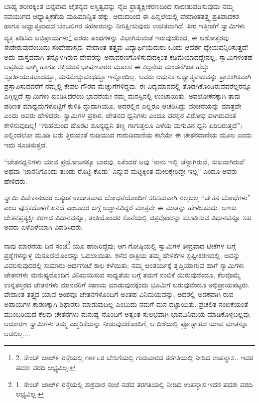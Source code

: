 ಬಾಹ್ಯ ಶರೀರಕ್ಕಿಂತ ಭಿನ್ನವಾದ ಚೈತನ್ಯದ ಅಸ್ತಿತ್ವವನ್ನು ನೈಜ ಪ್ರಾತ್ಯಕ್ಷೀಕರಣದಿಂದ ಸಾಬೀತುಪಡಿಸುವುದು ನಮ್ಮ ನವಯುಗದ ಆಧ್ಯಾತ್ಮಿಕತೆಯ ಮಹಿಮಾನ್ವಿತ ಹಕ್ಕು. ಆದುದರಿಂದ ಈ ಹಿನ್ನಲೆಯಲ್ಲಿ ವೇದಾಂತತತ್ತ್ವ ಪ್ರತಿಪಾದಕರ ಹಾಗೂ ಆಧ್ಯಾತ್ಮವಾದದ ಬೆಂಬಲಿಗರ ಸಹಕಾರವನ್ನು ನೀರಿಕ್ಷೀಸುವುದು ಉಚಿತವಾಗಿದೆ. ತೀರ ಇತ್ತೀಚೆಗೆ ಸ್ವಾಮಿಗಳು ವ್ಯಕ್ತ ಪಡಿಸಿದ ಅಭಿಪ್ರಾಯಗಳು\footnote{2. ಸೇಂಟ್ ಜಾರ್ಜ್ ರಸ್ತೆಯಲ್ಲಿ ೧೮೯೬ರ ಬೇಸಿಗೆಯಲ್ಲಿ ಗುರುವಾರದ ತರಗತಿಯಲ್ಲಿ ನೀಡಿದ ಉಪನ್ಯಾಸ.. ಇದರ ಪದಶಃ ವರದಿ ಲಭ್ಯವಿಲ್ಲ.} ಎರಡು ಪಂಥಗಳನ್ನು ವಿಭಾಗಿಸುವಂತೆ ಇರುವುದರಿಂದ, ಈ ಆಶೋತ್ತರವು ಈಡೇರುವುದೆಂಬುದು ಸಂದೇಹಾಸ್ಪದ. ವೇದಾಂತ ತತ್ತ್ವವು ವಿದ್ಯಾರ್ಥಿಯೆದುರು ಒಂದು ಆದರ್ಶ ಧ್ಯೇಯವನ್ನಿರಿಸುತ್ತದೆ! ಅದು ವಾಸ್ತವವಾಗಿ ತನ್ನೊಳಗಿರುವ ದೇವರನ್ನು ಅನಾವರಣಗೊಳಿಸುವುದಕ್ಕಿಂತ ಕಡಿಮೆಯಾದದ್ದೇನಲ್ಲ; ಸ್ವಾಮಿಗಳಂತಹ ಅಪ್ರತಿಮ ವಾಗ್ಮಿ ಹಾಗೂ ಶಕ್ತಿಯುತ ಭಾಷಣಕಾರರ ಮೂಲಕ ಈ ಕಲ್ಪನೆಯ ಮಂಡನೆಗಿಂತ ಹೆಚ್ಚು ಸ್ಫೂರ್ತಿಯುತವಾದದ್ದೂ, ಮನಮೆಚ್ಚುವಂಥದ್ದೂ ಇನ್ನೊಂದಿಲ್ಲ. ಅವರು ಆಧುನಿಕ ಅಧ್ಯಾತ್ಮವಾದವನ್ನು ಪ್ರಾಸಂಗಿಕವಾಗಿ ಪ್ರಸ್ತಾಪಿಸುವವರೆಗೆ ನಮ್ಮಲ್ಲಿ ಕೇವಲ ಗೌರವ ಮೆಚ್ಚುಗೆಗಳಿದ್ದವು. ಈ ವಿದ್ಯಮಾನದಲ್ಲಿ ತೊಡಗಿಕೊಂಡಿರುವವರೆಲ್ಲರನ್ನೂ ಎಗ್ಗಿಲ್ಲದೆ ಸ್ವಾಮಿಗಳು ಖಂಡಿಸಿದರೆಂಬ ಭಾವನೆಯೇ ನಮ್ಮ ಮನಸ್ಸಿನಲ್ಲಿ ಉಂಟಾಯಿತು. ಅವಲೋಕನಕ್ಕಾಗಿ ತಾವು ಪರಿಣತ ಮಾಧ್ಯಮಗಳೊಟ್ಟಿಗೆ ಕುಳಿತಿ ದ್ದುದಾಗಿಯೂ, ಅದರಲ್ಲಿನ ಎಲ್ಲರೂ ಆಚರಿಸಿದ್ದು ವಂಚನೆಯನ್ನು ಮಾತ್ರವೇ ಎಂದು ಅವರು ಹೇಳಿದರು. ಸ್ವಾಮಿಗಳ ಪ್ರಕಾರ, ಚೇತನದ ಧ್ವನಿಗಳು ಎಂದೂ ಪರಸ್ಪರ ವಿರೋಧ ವಾಗಿರುವಂತೆ ಕೇಳಿಸುವುದಿಲ್ಲ! “ಗುಹೆಯಿಂದ ಹೊರಟ ಶೂನ್ಯಧ್ವನಿ ತಣ್ಣ ಗಾಗುತ್ತಲೂ ಎಳೆಯ ಮಗುವಿನ ಧ್ವನಿ ಏರಿಬರುತ್ತದೆ”; ಎಲ್ಲಿಂದಲೋ ಮೂಡಿ ಬರು ತ್ತಿರುವಂತೆ ನುಡಿಯುವ ಗಾರುಡಿವಾಣಿಯ ಕಲೆಯೇ ಈ ಚೇತನವಾಣಿಯ ಮೂಲ ಎಂದು ಇದು ಸೂಚಿಸುತ್ತದೆ.

“ಚೇತನಧ್ವನಿಗಳು ಯಾವ ಪ್ರಯೋಜನಕ್ಕೂ ಬಾರವು, ಏಕೆಂದರೆ ಅವು ‘ನಾನು ಇಲ್ಲಿ ಚೆನ್ನಾಗಿರುವೆ, ಸುಖವಾಗಿರುವೆ’ ಅಥವಾ ‘ಜಾನನಿಗೊಂದು ತುಂಡು ರೊಟ್ಟಿ ಕೊಡು’ ಎನ್ನುವ ಮಟ್ಟಕ್ಕಿಂತ ಮೇಲಕ್ಕೇರಿದ್ದೇ ಇಲ್ಲ” ಎಂದೂ ಅವರು ಹೇಳಿದರು.

ಸ್ವಾಮಿ ವಿವೇಕಾನಂದರ ಅತ್ಯಂತ ಉದಾತ್ತವಾದ ಬೋಧನೆಯೊಂದಿಗೆ ಸರಿಸಮವಾಗಿ ನಿಲ್ಲಬಲ್ಲ “ಚೇತನ ಬೋಧೆಗಳು” ಎಂಬ ಪುಸ್ತಕದೊಳಗೆ ಏನಿದೆ ಎಂಬುದರ ಬಗ್ಗೆ ಅಜ್ಞಾನವಿದ್ದರೆ ಮಾತ್ರವೇ ಈ ಮಾತನ್ನು ಹೇಳಬಹುದು. ಅಣಕು ಚೇತನಪ್ರತ್ಯಕ್ಷೀ ಕರಣದ ವಿಧಾನವನ್ನೂ, ತಂತಿಯೊಂದರ ಕೊನೆಯಲ್ಲಿ ಚಿತ್ರವೊಂದನ್ನು ಮೂಡಿಸುವ ವಿಧಾನವನ್ನೂ ಸಹ ಅವರು ಎಳೆಎಳೆಯಾಗಿ ವಿವರಿಸಿದರು.

ನಾವು ಮಾರನೆಯ ದಿನ ಸಂಜೆ\footnote{1. ಸೇಂಟ್ ಜಾರ್ಜ್ ರಸ್ತೆಯಲ್ಲಿ ಶುಕ್ರವಾರ ಸಂಜೆ ನಡೆದ ತರಗತಿಯಲ್ಲಿ ನೀಡಿದ ಉಪನ್ಯಾಸ ಇದರ ಪದಶಃ ವರದಿ ಲಭ್ಯವಿಲ್ಲ.} ಯೂ ಹಾಜರಿದ್ದೆವು; ಆಗ ಗೋಷ್ಠಿಯಲ್ಲಿ ಸ್ವಾಮಿಗಳ ತೀವ್ರವಾದ ಟೀಕೆಗಳ ಬಗ್ಗೆ ಪ್ರಶ್ನೆಗಳನ್ನುಳ್ಳ ಮಸೂದೆಯೊಂದನ್ನು ಓದಲಾಯಿತು. ಕಳೆದ ರಾತ್ರಿಯ ತಮ್ಮ ಹೇಳಿಕೆಗಳ ಸ್ಪಷ್ಟೀಕರಣದಲ್ಲಿ, ಅವನ್ನು ವಿವರಿಸುವುದರಲ್ಲಿ ಸುಮಾರು ಅರ್ಧಗಂಟೆ ಕಾಲ ಕಳೆಯಿತು; ನಮ್ಮ ಆಂತರ್ಯಕ್ಕೆ ತೃಪ್ತಿಯಾಗುವ ಹಾಗೆ ಸ್ವಾಮಿಗಳು ಚೇತನಗಳು ಮನುಷ್ಯರೊಂದಿಗೆ ವಿನಿಮಯಿಸುವ ಸಾಧ್ಯತೆಯ ಬಗ್ಗೆ ತಮಗೆ ನಂಬಿಕೆ ಯಿರುವುದೆಂದೂ, ಕೆಲವೊಮ್ಮೆ ಉನ್ನತಸ್ತರದ ಚೇತನಗಳು ಮಾನವರಿಗೆ ಸಹಾಯ ಮಾಡುವುದಕ್ಕೆಂದು ಭೂಮಿಗೆ ಬರುವುವೆಂದೂ ಅಭಿಪ್ರಾಯಪಟ್ಟರು. ವೇದಾಂತ ತತ್ತ್ವದ ಯಾವ ಅಂಶವೂ ಚೇತನಗಳೊಂದಿಗೆ ಅಂತಹ ವಿನಿಮಯವನ್ನು, ಅದರಲ್ಲಿ ಅಡಕವಾಗಿ ರುವ ಅಪಾಯಗಳ ಕಾರಣಕ್ಕಾಗಿ ಶಿಫಾರಸು ಮಾಡುವುದಿಲ್ಲ ಎಂಬುದು ನಮಗೆ ಮನ ದಟ್ಟಾಯಿತು. ಪ್ರಚಲಿತ ನಂಬಿಕೆಯಂತೆ ಮುಂಬರಿಯದ ಕೆಲವು ಚೇತನಗಳು ಮನುಷ್ಯ ನೊಂದಿಗೆ ಅತ್ಯಂತ ಸುಲಭವಾಗಿ ಭಾವವಿನಿಮಯ ಮಾಡಿಕೊಳ್ಳಬಲ್ಲವು; ಆದಕಾರಣ ಸ್ವಾಮಿಗಳು ತಮ್ಮ ಎಚ್ಚರಿಕೆಯನ್ನು ನೀಡುವುದರೊಂದಿಗೆ, ಆ ದಿಶೆಯಲ್ಲಿ ಪ್ರೋತ್ಸಾಹದ ಯಾವ ಮಾತನ್ನೂ ಆಡಲಿಲ್ಲ....

